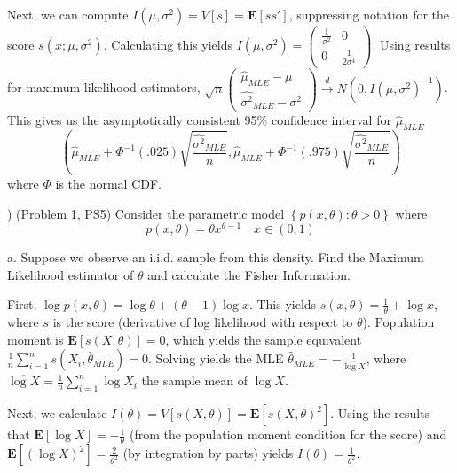 \documentclass[12pt,english]{article}
\begin{document}
Next, we can compute $I(\mu, \sigma^{2}) = V[s] = \mathbf{E}[ss']$, suppressing notation for the score $s(x; \mu, \sigma^{2})$. Calculating this yields $I(\mu, \sigma^{2}) = \left( \begin{array}{cc} \frac{1}{\sigma^{2}} & 0 \\ 0 & \frac{1}{2 \sigma^{4}} \end{array} \right)$. Using results for maximum likelihood estimators, $\sqrt{n} \left( \begin{array}{c} \hat{\mu}_{MLE} - \mu \\ \hat{\sigma^{2}}_{MLE} - \sigma^{2} \end{array} \right) \overset{d}{\to} N(0, I(\mu, \sigma^{2})^{-1})$. This gives us the asymptotically consistent 95\% confidence interval for $\hat{\mu}_{MLE}$
$$ \left( \hat{\mu}_{MLE} + \Phi^{-1}(.025) \sqrt{\frac{\hat{\sigma^{2}}_{MLE}}{n}}, \hat{\mu}_{MLE} + \Phi^{-1}(.975) \sqrt{\frac{\hat{\sigma^{2}}_{MLE}}{n}} \right)$$
where $\Phi$ is the normal CDF.

\vspace{1em}
) (Problem 1, PS5) Consider the parametric model $\left\{ p\left( x,\theta \right)
:\theta >0\right\} $ where
\begin{equation*}
p\left( x,\theta \right) =\theta x^{\theta -1}\text{~~~}x\in \left(
0,1\right)
\end{equation*}

a. Suppose we observe an i.i.d. sample from this density. Find the
Maximum Likelihood estimator of $\theta$ and calculate the Fisher
Information.
\vspace{1em}

First, $\log p(x, \theta) = \log \theta + (\theta - 1) \log x$. This yields $s(x, \theta) = \frac{1}{\theta}  + \log x$, where $s$ is the score (derivative of log likelihood with respect to $\theta$). Population moment is $\mathbf{E}[s(X, \theta)] = 0$, which yields the sample equivalent $\frac{1}{n} \sum_{i=1}^{n} s(X_{i}, \hat{\theta}_{MLE}) = 0$. Solving yields the MLE $\hat{\theta}_{MLE} = -\frac{1}{\overline{\log X}}$, where $\overline{\log X} = \frac{1}{n} \sum_{i=1}^{n} \log X_{i}$ the sample mean of $\log X$.

Next, we calculate $I(\theta) = V[s(X, \theta)] = \mathbf{E}[s(X, \theta)^{2}]$.  Using the results that $\mathbf{E}[\log X] = -\frac{1}{\theta}$ (from the population moment condition for the score) and $\mathbf{E}[(\log X)^{2}] = \frac{2}{\theta^{2}}$ (by integration by parts) yields $I(\theta) = \frac{1}{\theta^{2}}$.
\end{document}
